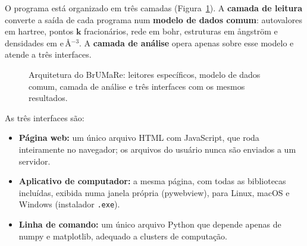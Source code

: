 O programa está organizado em três camadas (Figura~\ref{fig:arq}). A \textbf{camada de leitura} converte a saída de cada programa num \textbf{modelo de dados comum}: autovalores em hartree, pontos $\mathbf k$ fracionários, rede em bohr, estruturas em ångström e densidades em e\,Å$^{-3}$. A \textbf{camada de análise} opera apenas sobre esse modelo e atende a três interfaces.

\begin{figure}[htbp]\centering
{}
\caption{Arquitetura do BrUMaRe: leitores específicos, modelo de dados comum, camada de análise e três interfaces com os mesmos resultados.}\label{fig:arq}
\end{figure}

As três interfaces são:
\begin{itemize}
\item \textbf{Página web:} um único arquivo HTML com JavaScript, que roda inteiramente no navegador; os arquivos do usuário nunca são enviados a um servidor.
\item \textbf{Aplicativo de computador:} a mesma página, com todas as bibliotecas incluídas, exibida numa janela própria (pywebview), para Linux, macOS e Windows (instalador \texttt{.exe}).
\item \textbf{Linha de comando:} um único arquivo Python que depende apenas de numpy e matplotlib, adequado a clusters de computação.
\end{itemize}

